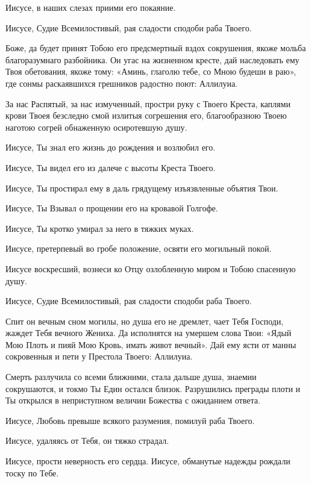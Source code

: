 Иисусе, в наших слезах приими его покаяние. 

Иисусе, Судие Всемилостивый, рая сладости сподоби раба Твоего.




Боже, да будет принят Тобою его предсмертный вздох сокрушения, якоже мольба благоразумнаго разбойника. Он угас на жизненном кресте, дай наследовать ему Твоя обетования, якоже тому: «Аминь, глаголю тебе, со Мною будеши в раю», где сонмы раскаявшихся грешников радостно поют: Аллилуиа.




За нас Распятый, за нас измученный, простри руку с Твоего Креста, каплями крови Твоея безследно смой излитыя согрешения его, благообразною Твоею наготою согрей обнаженную осиротевшую душу. 

Иисусе, Ты знал его жизнь до рождения и возлюбил его. 

Иисусе, Ты видел его из далече с высоты Креста Твоего. 

Иисусе, Ты простирал ему в даль грядущему изъязвленные объятия Твои. 

Иисусе, Ты Взывал о прощении его на кровавой Голгофе. 

Иисусе, Ты кротко умирал за него в тяжких муках. 

Иисусе, претерпевый во гробе положение, освяти его могильный покой. 

Иисусе воскресший, вознеси ко Отцу озлобленную миром и Тобою спасенную душу. 

Иисусе, Судие Всемилостивый, рая сладости сподоби раба Твоего.




Спит он вечным сном могилы, но душа его не дремлет, чает Тебя Господи, жаждет Тебя вечного Жениха. Да исполнятся на умершем слова Твои: «Ядый Мою Плоть и пияй Мою Кровь, имать живот вечный». Дай ему ясти от манны сокровенныя и пети у Престола Твоего: Аллилуиа.




Смерть разлучила со всеми ближними, стала дальше душа, знаемии сокрушаются, и токмо Ты Един остался близок. Разрушились преграды плоти и Ты открылся в неприступном величии Божества с ожиданием ответа. 

Иисусе, Любовь превыше всякого разумения, помилуй раба Твоего. 

Иисусе, удаляясь от Тебя, он тяжко страдал. 

Иисусе, прости неверность его сердца. Иисусе, обманутые надежды рождали тоску по Тебе. 

